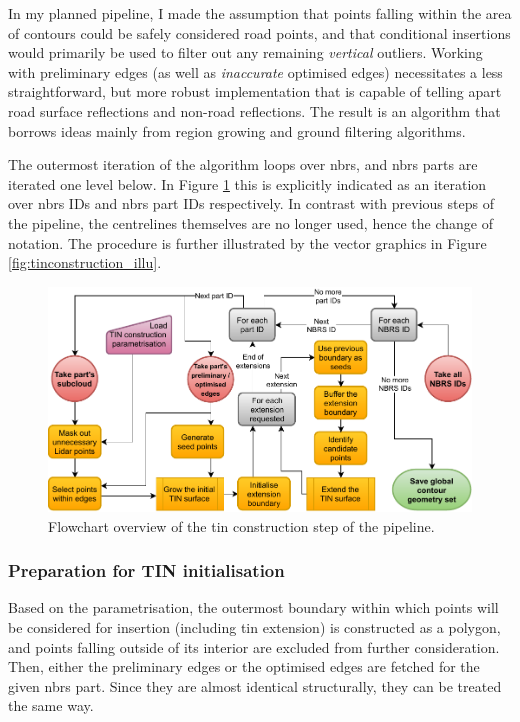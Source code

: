 In my planned pipeline, I made the assumption that points falling within the area of contours could be safely considered road points, and that conditional insertions would primarily be used to filter out any remaining \textit{vertical} outliers. Working with preliminary edges (as well as \textit{inaccurate} optimised edges) necessitates a less straightforward, but more robust implementation that is capable of telling apart road surface reflections and non-road reflections. The result is an algorithm that borrows ideas mainly from region growing and ground filtering algorithms.

The outermost iteration of the algorithm loops over \ac{nbrs}, and \ac{nbrs} parts are iterated one level below. In Figure \ref{fig:tinconstructionflow} this is explicitly indicated as an iteration over \ac{nbrs} IDs and \ac{nbrs} part IDs respectively. In contrast with previous steps of the pipeline, the centrelines themselves are no longer used, hence the change of notation. The procedure is further illustrated by the vector graphics in Figure \ref{fig:tinconstruction_illu}.

\begin{figure}
    \centering
    \includegraphics[width=\linewidth]{final_report/figs/tin_construction.pdf}
    \caption[Flowchart illustrating of the TIN construction step]{Flowchart overview of the \ac{tin} construction step of the pipeline.}
    \label{fig:tinconstructionflow}
\end{figure}

\subsubsection{Preparation for TIN initialisation}

Based on the parametrisation, the outermost boundary within which points will be considered for insertion (including \ac{tin} extension) is constructed as a polygon, and points falling outside of its interior are excluded from further consideration. Then, either the preliminary edges or the optimised edges are fetched for the given \ac{nbrs} part. Since they are almost identical structurally, they can be treated the same way.

